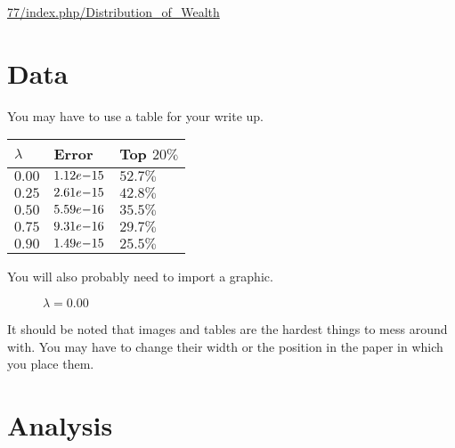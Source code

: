 \documentclass{article}%
\begin{document}
\noindent\url{77/index.php/Distribution_of_Wealth}

\section{Data}
You may have to use a table for your write up.
\begin{table}[h]%
  \centering
  \begin{tabular}{| l | l | l |}
    \hline
    $\lambda$&Error&Top $20\%$\\
    \hline
    $0.00$&$1.12\normalfont{e-}15$&$52.7\%$\\
    $0.25$&$2.61\normalfont{e-}15$&$42.8\%$\\
    $0.50$&$5.59\normalfont{e-}16$&$35.5\%$\\
    $0.75$&$9.31\normalfont{e-}16$&$29.7\%$\\
    $0.90$&$1.49\normalfont{e-}15$&$25.5\%$\\
    \hline
    \end{tabular}
\end{table}

You will also probably need to import a graphic.
\begin{figure}[h]%
  \centering
  \caption{$\lambda = 0.00$}%
\end{figure}
It should be noted that images and tables are the hardest things to mess around with. You may have to change their width or the position in the paper in which you place them.

\section{Analysis}
\end{document}
